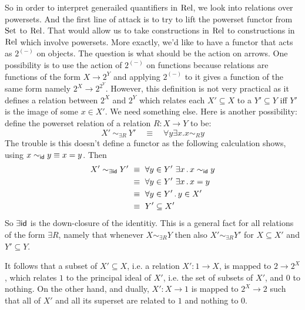 So in order to interpret generailed quantifiers in $\mathrm{Rel}$, we look
into relations over powersets. And the first line of attack is to try
to lift the powerset functor from $\mathrm{Set}$ to $\mathrm{Rel}$. That would allow
us to take constructions in $\mathrm{Rel}$ to constructions in $\mathrm{Rel}$ which
involve powersets. More exactly, we'd like to have a functor that acts
as $2^(-)$ on objects. The question is what should be the action on
arrows.  One possibility is to use the action of $2^{(-)}$ on
functions because relations are functions of the form $X \to 2^Y$ and
applying $2^{(-)}$ to it gives a function of the same form namely $2^X
\to 2^{2^Y}$. However, this definition is not very practical as it
defines a relation between $2^X$ and $2^Y$ which relates each $X'
\subseteq X$ to a $Y' \subseteq Y$ iff $Y'$ is the image of some $x
\in X'$. We need something else.  Here is another possibility:
define the powerset relation of a relation $R : X \to Y$ to be:
%
\begin{equation}\label{eq:power}
X' ~ \sim_{\exists R} ~ Y' \quad \equiv \quad \forall y \exists x . x \sim_R y
\end{equation}
% 
The trouble is this doesn't define a functor as the following
calculation shows, using $x \sim_{\mathsf{id}} y
\equiv x = y$. Then 
\begin{align*}
    X' \sim_{\exists \mathsf{id}} Y' & ~ \equiv ~ \forall y \in Y' ~ \exists x \,.\, x \sim_{\mathsf{id}} y\\
&~\equiv~ \forall y \in Y' ~ \exists x\,.\, x = y \\
&~\equiv~\forall y \in Y' \,.\, y \in X'\\
& ~\equiv ~ Y' \subseteq X'
  \end{align*}
%
So $\exists \mathsf{id}$ is the down-closure of the identitiy. This is a general
fact for all relations of the form $\exists R$, namely that whenever $X
\sim_{\exists R} Y$ then also $X' \sim_{\exists R} Y'$ for $X \subseteq X'$ and
$Y' \subseteq Y$. 

\begin{remark}
It follows that a subset of $X' \subseteq X$, i.e. a relation $X' : 1 \to X$, is
mapped to $2 \to 2^X$, which relates $1$ to the principal ideal of
$X'$, i.e. the set of subsets of $X'$, and $0$ to nothing. On the
other hand, and dually, $X' : X \to 1$ is mapped to $2^X \to 2$ such
that all of $X'$ and all its superset are related to $1$ and nothing
to $0$. 
\end{remark}

